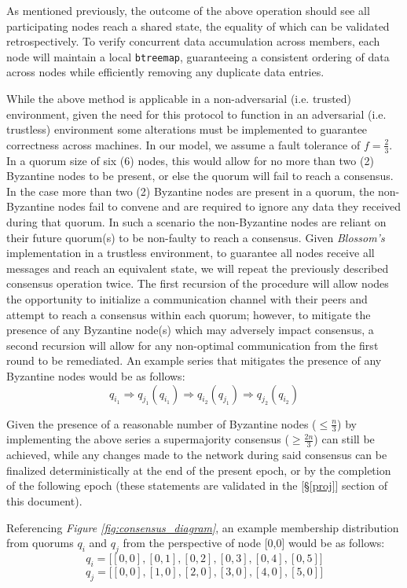 As mentioned previously, the outcome of the above operation should see all participating nodes reach a shared state, the equality of which can be validated retrospectively. To verify concurrent data accumulation across members, each node will maintain a local \texttt{btreemap}, guaranteeing a consistent ordering of data across nodes while efficiently removing any duplicate data entries.

While the above method is applicable in a non-adversarial (i.e. trusted) environment, given the need for this protocol to function in an adversarial (i.e. trustless) environment some alterations must be implemented to guarantee correctness across machines. In our model, we assume a fault tolerance of \(f = \frac{2}{3}\). In a quorum size of six (6) nodes, this would allow for no more than two (2) Byzantine nodes to be present, or else the quorum will fail to reach a consensus. In the case more than two (2) Byzantine nodes are present in a quorum, the non-Byzantine nodes fail to convene and are required to ignore any data they received during that quorum. In such a scenario the non-Byzantine nodes are reliant on their future quorum(s) to be non-faulty to reach a consensus. Given \textit{Blossom’s} implementation in a trustless environment, to guarantee all nodes receive all messages and reach an equivalent state, we will repeat the previously described consensus operation twice. The first recursion of the procedure will allow nodes the opportunity to initialize a communication channel with their peers and attempt to reach a consensus within each quorum; however, to mitigate the presence of any Byzantine node(s) which may adversely impact consensus, a second recursion will allow for any non-optimal communication from the first round to be remediated. An example series that mitigates the presence of any Byzantine nodes would be as follows:
\[
q_{i_1}
\Rightarrow
q_{j_1}(q_{i_1})
\Rightarrow
q_{i_2}(q_{j_1})
\Rightarrow
q_{j_2}(q_{i_2})
\]

Given the presence of a reasonable number of Byzantine nodes (\(\le \frac{n}{3} \)) by implementing the above series a supermajority consensus (\(\ge \frac{2n}{3} \)) can still be achieved, while any changes made to the network during said consensus can be finalized deterministically at the end of the present epoch, or by the completion of the following epoch (these statements are validated in the  [\S\ref{proj}] section of this document).

Referencing \textit{Figure \ref{fig:consensus_diagram}}, an example membership distribution from quorums \(q_i\) and \(q_j\) from the perspective of node [0,0] would be as follows:
\[
q_i = \big[
[0,0],[0,1],[0,2],[0,3],[0,4],[0,5]
\big]
\]
\[
q_j = \big[
[0,0],[1,0],[2,0],[3,0],[4,0],[5,0]
\big]
\]

